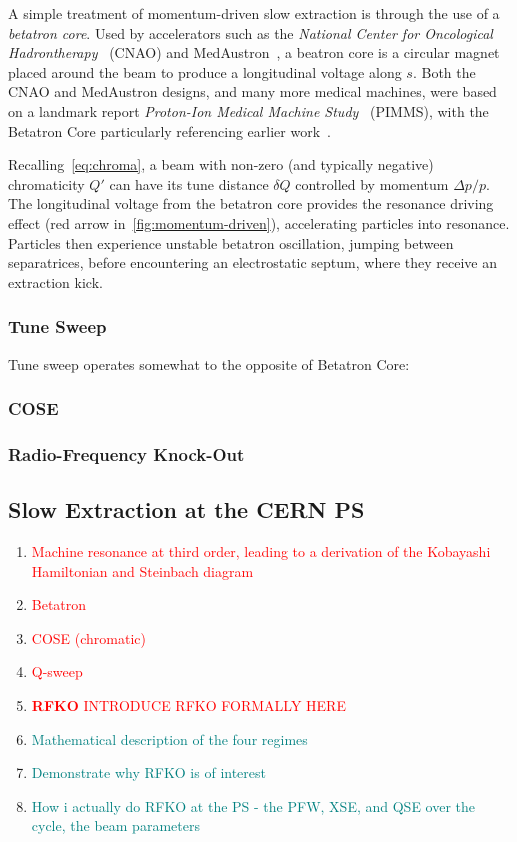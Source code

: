 \documentclass[11pt]{report}
\newcommand\todo[1]{\textcolor{red}{#1}}
\begin{document}
A simple treatment of momentum-driven slow extraction is through the use of a \textit{betatron core}. Used by accelerators such as the \textit{National Center for Oncological Hadrontherapy}~\cite{Falbo:IPAC2018-TUZGBF3} (CNAO) and MedAustron~\cite{pablo}, a beatron core is a circular magnet placed around the beam to produce a longitudinal voltage along $s$. Both the CNAO and MedAustron designs, and many more medical machines, were based on a landmark report \textit{Proton-Ion Medical Machine Study}~\cite{PIMMS} (PIMMS), with the Betatron Core particularly referencing earlier work~\cite{betatroncore}.

Recalling~\autoref{eq:chroma}, a beam with non-zero (and typically negative) chromaticity $Q'$ can have its tune distance $\delta Q$ controlled by momentum $\Delta p/p$. The longitudinal voltage from the betatron core provides the resonance driving effect (red arrow in~\autoref{fig:momentum-driven}), accelerating particles into resonance. Particles then experience unstable betatron oscillation, jumping between separatrices, before encountering an electrostatic septum, where they receive an extraction kick.

\subsubsection{Tune Sweep}
Tune sweep operates somewhat to the opposite of Betatron Core: 

\subsubsection{COSE}

\subsubsection{Radio-Frequency Knock-Out}

\subsection{Slow Extraction at the CERN PS}

\begin{enumerate}
  \item \todo{Machine resonance at third order, leading to a derivation of the Kobayashi Hamiltonian and Steinbach diagram} \checkmark
  \item \todo{Betatron} \checkmark
  \item \todo{COSE (chromatic)}
  \item \todo{Q-sweep}
  \item \todo{\textbf{RFKO} INTRODUCE RFKO FORMALLY HERE}
  \item \textcolor{teal}{Mathematical description of the four regimes}
  
  \item \textcolor{teal}{Demonstrate why RFKO is of interest}
  \item \textcolor{teal}{How i actually do RFKO at the PS - the PFW, XSE, and QSE over the cycle, the beam parameters}
\end{enumerate}
\end{document}
